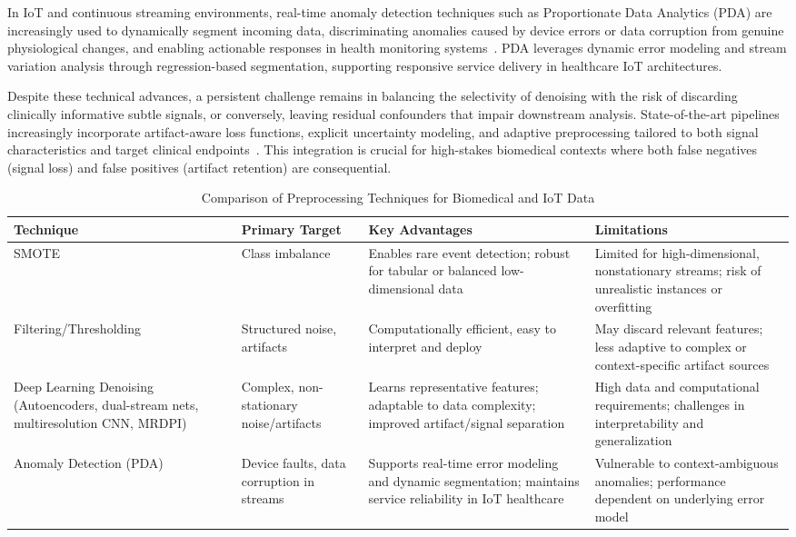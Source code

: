\documentclass[sigconf]{acmart}
\begin{document}
In IoT and continuous streaming environments, real-time anomaly detection techniques such as Proportionate Data Analytics (PDA) are increasingly used to dynamically segment incoming data, discriminating anomalies caused by device errors or data corruption from genuine physiological changes, and enabling actionable responses in health monitoring systems~\cite{ref90,ref106}. PDA leverages dynamic error modeling and stream variation analysis through regression-based segmentation, supporting responsive service delivery in healthcare IoT architectures.

Despite these technical advances, a persistent challenge remains in balancing the selectivity of denoising with the risk of discarding clinically informative subtle signals, or conversely, leaving residual confounders that impair downstream analysis. State-of-the-art pipelines increasingly incorporate artifact-aware loss functions, explicit uncertainty modeling, and adaptive preprocessing tailored to both signal characteristics and target clinical endpoints~\cite{ref106}. This integration is crucial for high-stakes biomedical contexts where both false negatives (signal loss) and false positives (artifact retention) are consequential.

\begin{table*}[htbp]
\centering
\caption{Comparison of Preprocessing Techniques for Biomedical and IoT Data}
\label{tab:preprocessing_comparison}
\begin{adjustbox}{max width=\textwidth}
\begin{tabular}{@{}llll@{}}
\toprule
\textbf{Technique} & \textbf{Primary Target} & \textbf{Key Advantages} & \textbf{Limitations} \\
\midrule
SMOTE & Class imbalance & Enables rare event detection; robust for tabular or balanced low-dimensional data & Limited for high-dimensional, nonstationary streams; risk of unrealistic instances or overfitting\\
Filtering/Thresholding & Structured noise, artifacts & Computationally efficient, easy to interpret and deploy & May discard relevant features; less adaptive to complex or context-specific artifact sources\\
Deep Learning Denoising (Autoencoders, dual-stream nets, multiresolution CNN, MRDPI) & Complex, non-stationary noise/artifacts & Learns representative features; adaptable to data complexity; improved artifact/signal separation~\cite{ref96,ref97,ref102} & High data and computational requirements; challenges in interpretability and generalization\\
Anomaly Detection (PDA) & Device faults, data corruption in streams & Supports real-time error modeling and dynamic segmentation; maintains service reliability in IoT healthcare~\cite{ref90,ref106} & Vulnerable to context-ambiguous anomalies; performance dependent on underlying error model\\
\bottomrule
\end{tabular}
\end{adjustbox}
\end{table*}
\end{document}
